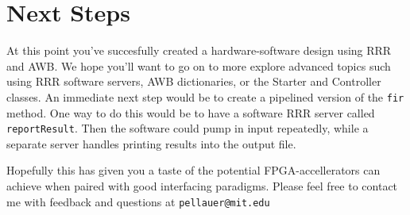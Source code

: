 \documentclass{article}
\begin{document}
\section{Next Steps}

At this point you've succesfully created a hardware-software design using RRR and AWB. We hope you'll want to go on to more explore
advanced topics such using RRR software servers, AWB dictionaries, or the Starter and Controller classes. An immediate next step
would be to create a pipelined version of the \texttt{fir} method. One way to do this would be to have a software RRR server called
\texttt{reportResult}. Then the software could pump in input repeatedly, while a separate server handles printing results into the
output file.

Hopefully this has given you a taste of the potential FPGA-accellerators can achieve when paired with good interfacing paradigms.
Please feel free to contact me with feedback and questions at \texttt{pellauer@mit.edu}
\end{document}
